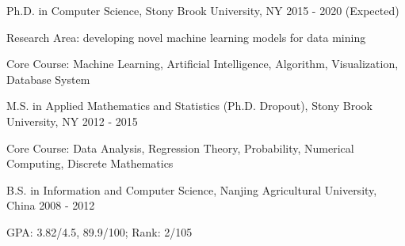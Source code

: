 


\begin{cventries}


\eduentry
{Ph.D. in Computer Science, Stony Brook University, NY} %
{2015 - 2020 (Expected)} %
{ %
\begin{cvitems}
\item {Research Area: developing novel machine learning models for data mining }
\item {Core Course: Machine Learning, Artificial Intelligence, Algorithm, Visualization, Database System}
\end{cvitems}
}


\eduentry
{M.S. in Applied Mathematics and Statistics (Ph.D. Dropout), Stony Brook University, NY} %
{2012 - 2015} %
{ %
\begin{cvitems}
\item {Core Course: Data Analysis, Regression Theory, Probability, Numerical Computing, Discrete Mathematics}
\end{cvitems}
}


\eduentry
{B.S. in Information and Computer Science, Nanjing Agricultural University, China} %
{2008 - 2012} %
{ %
\begin{cvitems}
\item {GPA: 3.82/4.5, 89.9/100; Rank: 2/105}
\end{cvitems}
}



\end{cventries}